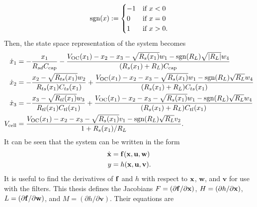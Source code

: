 \documentclass[../zhang_thesis.tex]{subfiles}
\begin{document}
\begin{equation}
    \operatorname{sgn}(x) := \begin{cases}
        -1 & \text{if } x<0 \\
        0 & \text{if } x=0 \\
        1 & \text{if } x>0.
    \end{cases}
\end{equation}
Then, the state space representation of the system becomes
\begin{align}
    \dot{x}_1 &= - \frac{x_1}{R_{sd}C_\text{cap}} - \frac{V_\text{OC}(x_1) - x_2 - x_3 - \sqrt{R_s(x_1)}w_1 - \operatorname{sgn}(R_L)\sqrt{|R_L|}w_4}{(R_s(x_1)+R_L)C_\text{cap}} \\
    \dot{x}_2 &= - \frac{x_2 - \sqrt{R_{ts}(x_1)}w_2}{R_{ts}(x_1)C_{ts}(x_1)} + \frac{V_\text{OC}(x_1) - x_2 - x_3 - \sqrt{R_s(x_1)}w_1 - \operatorname{sgn}(R_L)\sqrt{R_L}w_4}{(R_s(x_1)+R_L)C_{ts}(x_1)} \\
    \dot{x}_3 &= - \frac{x_3 - \sqrt{R_{tl}(x_1)}w_3}{R_{tl}(x_1)C_{tl}(x_1)} + \frac{V_\text{OC}(x_1) - x_2 - x_3 - \sqrt{R_s(x_1)}w_1 - \operatorname{sgn}(R_L)\sqrt{R_L}w_4}{(R_s(x_1)+R_L)C_{tl}(x_1)} \\
    V_\text{cell} &= \frac{V_\text{OC}(x_1) - x_2 - x_3 - \sqrt{R_s(x_1)}v_1 - \operatorname{sgn}(R_L)\sqrt{R_L}v_2}{1+R_s(x_1)/R_L}.
\end{align}
It can be seen that the system can be written in the form
\begin{align}
    \dot{\mathbf{x}} &= \mathbf{f}(\mathbf{x},\mathbf{u},\mathbf{w}) \\
    y &= h(\mathbf{x},\mathbf{u},\mathbf{v}).
\end{align}
It is useful to find the derivatives of $\mathbf{f}$ and $h$ with respect to $\mathbf{x}$, $\mathbf{w}$, and $\mathbf{v}$ for use with the filters. This thesis defines the Jacobians $F=(\partial\mathbf{f}/\partial\mathbf{x})$, $H=(\partial h/\partial\mathbf{x})$, $L=(\partial\mathbf{f}/\partial\mathbf{w})$, and $M=(\partial h/\partial\mathbf{v})$. Their equations are
\end{document}
